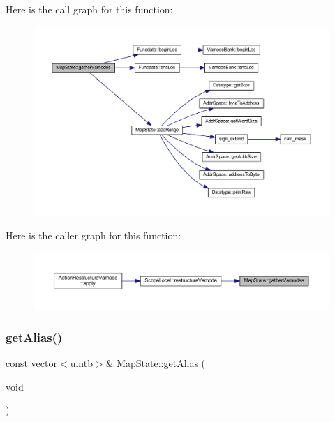 Here is the call graph for this function\+:
\nopagebreak
\begin{figure}[H]
\begin{center}
\leavevmode
\includegraphics[width=350pt]{class_map_state_a83662d09d19a51e0ecbf8b09e63e9628_cgraph}
\end{center}
\end{figure}
Here is the caller graph for this function\+:
\nopagebreak
\begin{figure}[H]
\begin{center}
\leavevmode
\includegraphics[width=350pt]{class_map_state_a83662d09d19a51e0ecbf8b09e63e9628_icgraph}
\end{center}
\end{figure}
\mbox{\label{class_map_state_ac012c72e8f7813346c8d74ce76f3faf0}} 
\subsubsection{\texorpdfstring{getAlias()}{getAlias()}}
{\footnotesize\ttfamily const vector$<$\mbox{\hyperlink{types_8h_a2db313c5d32a12b01d26ac9b3bca178f}{uintb}}$>$\& Map\+State\+::get\+Alias (\begin{DoxyParamCaption}\item[{void}]{ }\end{DoxyParamCaption})\hspace{0.3cm}{\ttfamily [inline]}}



